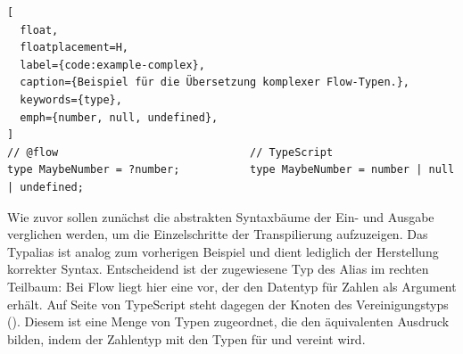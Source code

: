 {\begin{lstlisting}[
  float,
  floatplacement=H,
  label={code:example-complex},
  caption={Beispiel für die Übersetzung komplexer Flow-Typen.},
  keywords={type},
  emph={number, null, undefined},
]
// @flow                              // TypeScript
type MaybeNumber = ?number;           type MaybeNumber = number | null | undefined;
\end{lstlisting}

Wie zuvor sollen zunächst die abstrakten Syntaxbäume der Ein- und Ausgabe verglichen werden, um die Einzelschritte der Transpilierung aufzuzeigen. Das Typalias ist analog zum vorherigen Beispiel und dient lediglich der Herstellung korrekter Syntax. Entscheidend ist der zugewiesene Typ des Alias im rechten Teilbaum: Bei Flow liegt hier eine  vor, der den Datentyp für Zahlen als Argument erhält. Auf Seite von TypeScript steht dagegen der Knoten des Vereinigungstyps (). Diesem ist eine Menge von Typen zugeordnet, die den äquivalenten Ausdruck bilden, indem der Zahlentyp mit den Typen für  und  vereint wird.

}
